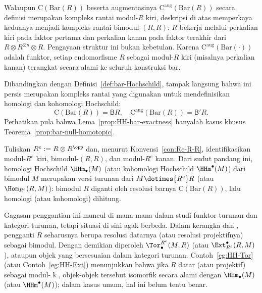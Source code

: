 \begin{example}
	Walaupun $\mathrm{C}(\mathrm{Bar}(R))$ beserta augmentasinya
	$\mathrm{C}^{\mathrm{aug}}(\mathrm{Bar}(R))$ secara definisi merupakan
	kompleks rantai modul-$R$ kiri, deskripsi di atas memperkaya keduanya
	menjadi kompleks rantai bimodul-$(R,R)$: $R$ bekerja melalui
	perkalian kiri pada faktor pertama dan perkalian kanan pada faktor
	terakhir dari $R\otimes R^{\otimes n}\otimes R$. Pengayaan struktur
	ini bukan kebetulan. Karena
	$\mathrm{C}^{\mathrm{aug}}(\mathrm{Bar}(\mathord\cdot))$ adalah funktor,
	setiap endomorfisme $R$ sebagai modul-$R$ kiri (misalnya perkalian
	kanan) terangkat secara alami ke seluruh konstruksi bar.

	Dibandingkan dengan Definisi~\ref{def:bar-Hochschild}, tampak langsung
	bahwa ini persis merupakan kompleks rantai yang digunakan untuk mendefinisikan
	homologi dan kohomologi Hochschild:
	\[ \mathrm{C}(\mathrm{Bar}(R)) = \mathsf{B} R, \quad \mathrm{C}^{\mathrm{aug}}(\mathrm{Bar}(R)) = \mathsf{B}' R. \]
	Perhatikan pula bahwa Lema~\ref{prop:HH-bar-exactness} hanyalah kasus
	khusus Teorema~\ref{prop:bar-null-homotopic}.

	Tuliskan $R^e:=R\otimes R^{\opp}$ dan, menurut
	Konvensi~\ref{con:Re-R-R}, identifikasikan modul-$R^e$ kiri,
	bimodul-$(R,R)$, dan modul-$R^e$ kanan. Dari sudut pandang ini, homologi
	Hochschild $\HHm_\bullet(M)$ (atau kohomologi Hochschild
	$\HHm^\bullet(M)$) dari bimodul $M$ merupakan versi turunan dari
	$M\dotimes{R^e}R$ (atau $\Hom_{R^e}(R,M)$): bimodul $R$ diganti oleh
	resolusi barnya $\mathrm{C}(\mathrm{Bar}(R))$, lalu homologi (atau
	kohomologi) dihitung.

	Gagasan penggantian ini muncul di mana-mana dalam studi funktor
	turunan dan kategori turunan, tetapi situasi di sini agak berbeda. Dalam
	kerangka  dan
	, pengganti $R$ seharusnya berupa
	resolusi datarnya (atau resolusi projektifnya) sebagai bimodul. Dengan
	demikian diperoleh $\Tor^{R^e}_\bullet(M,R)$ (atau
	$\Ext^\bullet_{R^e}(R,M)$), ataupun objek yang bersesuaian dalam
	kategori turunan. Contoh~\ref{eg:HH-Tor} (atau
	Contoh~\ref{eg:HH-Ext}) menunjukkan bahwa jika $R$ datar (atau
	projektif) sebagai modul-$\Bbbk$, objek-objek tersebut isomorfik secara
	alami dengan $\HHm_\bullet(M)$ (atau $\HHm^\bullet(M)$); dalam kasus
	umum, hal ini belum tentu benar.
\end{example}

